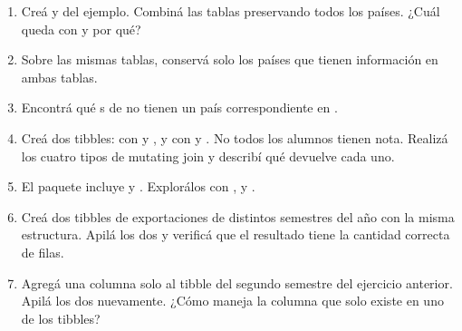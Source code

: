 \documentclass[8pt]{beamer}
\begin{document}
	\begin{frame}[fragile]
		\begin{enumerate}[start=8]
			\item Creá  y  del ejemplo. Combiná las tablas preservando todos los países. ¿Cuál queda con  y por qué?

			\item Sobre las mismas tablas, conservá solo los países que tienen información en ambas tablas.

			\item Encontrá qué s de  no tienen un país correspondiente en .

			\item Creá dos tibbles:  con  y , y  con  y . No todos los alumnos tienen nota. Realizá los cuatro tipos de mutating join y describí qué devuelve cada uno.

			\item El paquete  incluye  y . Explorálos con ,  y .

			\item Creá dos tibbles de exportaciones de distintos semestres del año con la misma estructura. Apilá los dos y verificá que el resultado tiene la cantidad correcta de filas.

			\item Agregá una columna  solo al tibble del segundo semestre del ejercicio anterior. Apilá los dos nuevamente. ¿Cómo maneja  la columna que solo existe en uno de los tibbles?
		\end{enumerate}
	\end{frame}
\end{document}
